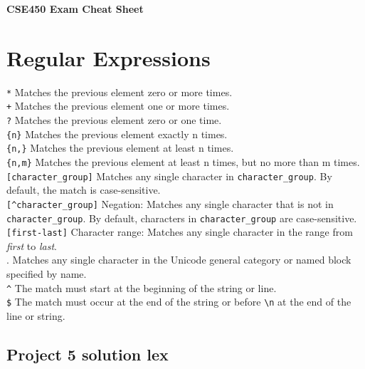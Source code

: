 \documentclass[10pt,landscape]{article}
\begin{document}
	
	\raggedright
	\footnotesize
	\begin{multicols}{3}
		\setlength{\premulticols}{1pt}
		\setlength{\postmulticols}{1pt}
		\setlength{\multicolsep}{1pt}
		\setlength{\columnsep}{2pt}
		
		\begin{center}
			\Large{\textbf{CSE450 Exam Cheat Sheet}} \\
		\end{center}
		
		\section{Regular Expressions}
		\verb|*| Matches the previous element zero or more times.\\
		\verb|+| Matches the previous element one or more times.\\
		\verb|?| Matches the previous element zero or one time.\\
		\verb|{n}| Matches the previous element exactly n times.\\
		\verb|{n,}| Matches the previous element at least n times.\\
		\verb|{n,m}| Matches the previous element at least n times, but no more than m times.\\
		\verb|[character_group]|  Matches any single character in \verb|character_group|. By default, the match is case-sensitive.\\
		\verb|[^character_group]| Negation: Matches any single character that is not in \verb|character_group|. By default, characters in \verb|character_group| are case-sensitive.\\
		\verb|[first-last]|  Character range: Matches any single character in the range from \textit{first} to \textit{last}.\\
		.  Matches any single character in the Unicode general category or named block specified by name.\\
		\verb|^|  The match must start at the beginning of the string or line. \\
		\verb|$|  The match must occur at the end of the string or before \verb|\n| at the end of the line or string.
	
		
		\subsection{Project 5 solution lex}
	

\end{multicols}
\end{document}
